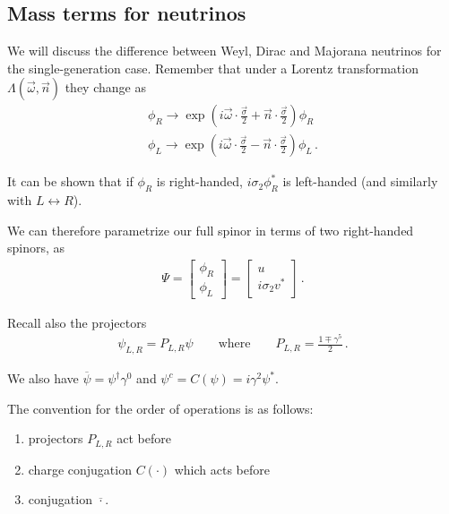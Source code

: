 \documentclass[main.tex]{subfiles}
\begin{document}
\subsection{Mass terms for neutrinos}


We will discuss the difference between Weyl, Dirac and Majorana neutrinos for 
the single-generation case. 
Remember that under a Lorentz transformation \(\Lambda (\vec{\omega}, \vec{n}) \) they change as 
%
\begin{align}
\phi_R \to \exp( i \vec{\omega} \cdot \frac{\vec{\sigma}}{2} + \vec{n} \cdot \frac{\vec{\sigma}}{2}) \phi _R \\
\phi_L \to \exp( i \vec{\omega} \cdot \frac{\vec{\sigma}}{2} - \vec{n} \cdot \frac{\vec{\sigma}}{2}) \phi _L
\,.
\end{align}

It can be shown that if \(\phi _R\) is right-handed, \(i \sigma_2 \phi_R^{*}\) is left-handed 
(and similarly with \(L \leftrightarrow R\)). 

We can therefore parametrize our full spinor in terms of two right-handed spinors, as 
%
\begin{align}
\Psi = \left[\begin{array}{c}
\phi _R \\ 
\phi _L
\end{array}\right]
=
\left[\begin{array}{c}
u \\ 
i \sigma_2 v^{*}
\end{array}\right]
\,.
\end{align}

Recall also the projectors 
%
\begin{align}
\psi_{L, R} = P_{L, R} \psi 
\qquad \text{where} \qquad
P_{L, R} = \frac{1 \mp \gamma^{5}}{2}
\,.
\end{align}

We also have \(\overline{\psi} = \psi ^\dag \gamma^{0}\) and \(\psi^{c} = C(\psi ) = i \gamma^{2} \psi^{*}\). 

The convention for the order of operations is as follows: 
\begin{enumerate}
    \item projectors \(P_{L, R}\) act before
    \item charge conjugation \(C( \cdot)\) which acts before
    \item conjugation \(\overline{\cdot}\).
\end{enumerate}
\end{document}
